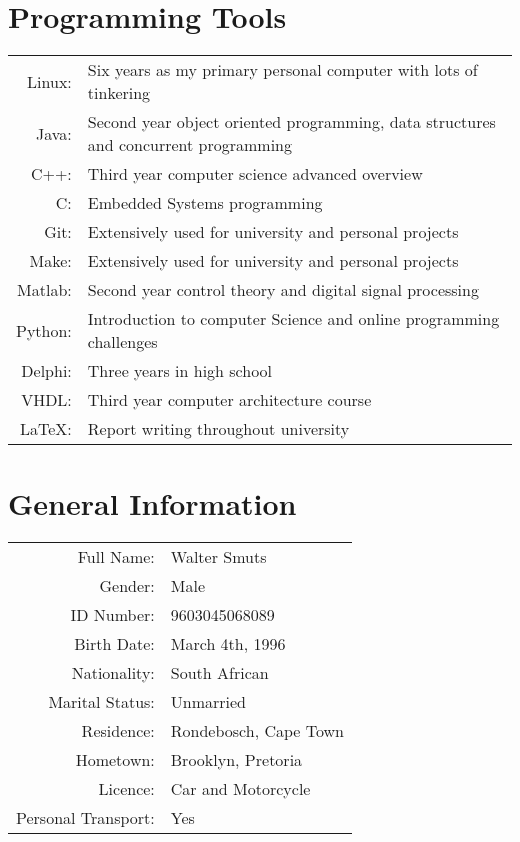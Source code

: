 \documentclass[twocolumn, 8pt]{extarticle}
\begin{document}
\section{Programming Tools}
\begin{center}
\renewcommand{\arraystretch}{2}
\begin{tabular}{r p{5.7cm}}
	Linux: & Six years as my primary personal computer with lots of tinkering \\
	Java: & Second year object oriented programming,
	data structures and concurrent programming \\
	C++: & Third year computer science advanced overview \\
	C: & Embedded Systems programming \\
	Git: & Extensively used for university and personal projects \\
	Make: & Extensively used for university and personal projects \\
	Matlab: & Second year control theory and digital signal processing \\
	Python: & Introduction to computer Science and online programming challenges \\
	Delphi: & Three years in high school \\
	VHDL: & Third year computer architecture course \\
	\LaTeX: & Report writing throughout university \\
\end{tabular}
\end{center}

\section{General Information}

\begin{center}
\renewcommand{\arraystretch}{2}
\begin{tabular}{r l}
	Full Name: & Walter Smuts \\
	Gender: & Male \\
	ID Number: & 9603045068089 \\
	Birth Date: & March 4th, 1996 \\
	Nationality: & South African \\
	Marital Status: & Unmarried \\
	Residence: & Rondebosch, Cape Town \\
	Hometown: & Brooklyn, Pretoria \\
	Licence: & Car and Motorcycle \\
	Personal Transport: & Yes \\
\end{tabular}
\end{center}
\end{document}
